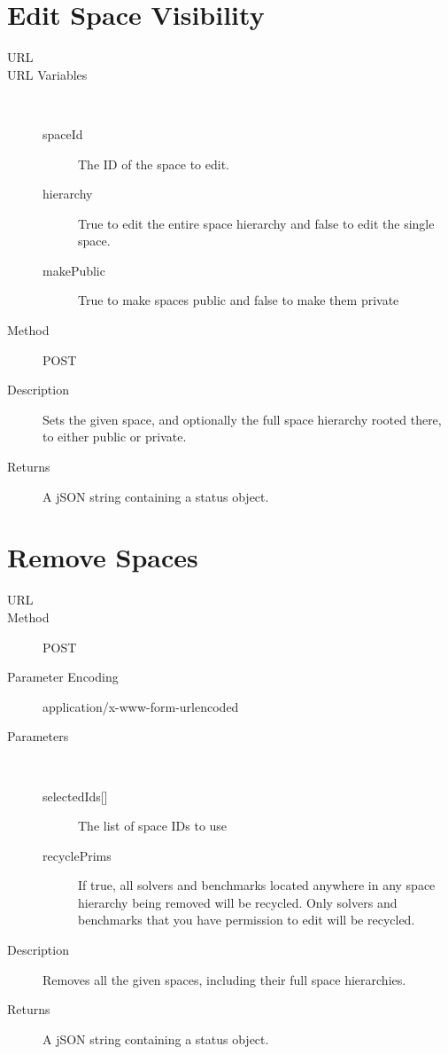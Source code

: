 \section{Edit Space Visibility}
\begin{description}
\item [URL] 
\item [URL Variables] \
	\begin{description}
	\item [spaceId]  The ID of the space to edit.
	\item [hierarchy]  True to edit the entire space hierarchy and false to edit the single space.
	\item [makePublic] \type{Boolean} True to make spaces public and false to make them private
	\end{description}
\item [Method] POST
\item [Description] Sets the given space, and optionally the full space hierarchy rooted there, to either public or private.
\item [Returns] A jSON string containing a status object.
\end{description}

\section{Remove Spaces}
\begin{description}
\item [URL] 
\item [Method] POST
\item [Parameter Encoding] application/x-www-form-urlencoded
\item [Parameters] \
	\begin{description}
	\item [{selectedIds[]}]  The list of space IDs to use
	\item [recyclePrims]  If true, all solvers and benchmarks located anywhere in any space hierarchy being removed will be recycled. Only solvers and benchmarks that you have permission to edit will be recycled.
	\end{description}
\item [Description] Removes all the given spaces, including their full space hierarchies.
\item [Returns] A jSON string containing a status object.
\end{description}

